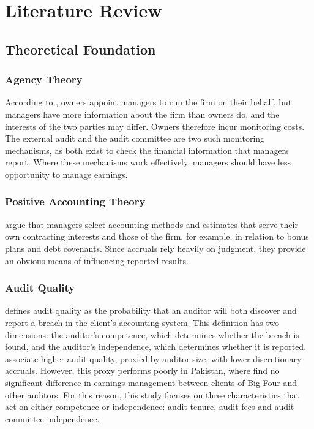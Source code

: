 \chapter{Literature Review}

\section{Theoretical Foundation}
\label{sec:theory}

\subsection{Agency Theory}

According to \textcite{jensen1976}, owners appoint managers to run the firm on their behalf, but managers have more information about the firm than owners do, and the interests of the two parties may differ. Owners therefore incur monitoring costs. The external audit and the audit committee are two such monitoring mechanisms, as both exist to check the financial information that managers report. Where these mechanisms work effectively, managers should have less opportunity to manage earnings.

\subsection{Positive Accounting Theory}

\textcite{watts1986} argue that managers select accounting methods and estimates that serve their own contracting interests and those of the firm, for example, in relation to bonus plans and debt covenants. Since accruals rely heavily on judgment, they provide an obvious means of influencing reported results.

\subsection{Audit Quality}

\textcite{deangelo1981} defines audit quality as the probability that an auditor will both discover and report a breach in the client's accounting system. This definition has two dimensions: the auditor's competence, which determines whether the breach is found, and the auditor's independence, which determines whether it is reported. \textcite{becker1998} associate higher audit quality, proxied by auditor size, with lower discretionary accruals. However, this proxy performs poorly in Pakistan, where \textcite{abid2018} find no significant difference in earnings management between clients of Big Four and other auditors. For this reason, this study focuses on three characteristics that act on either competence or independence: audit tenure, audit fees and audit committee independence.

